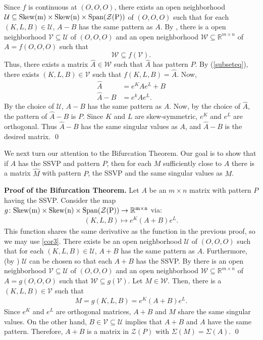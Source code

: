 \documentclass[preprint,12pt]{elsarticle}
\newcommand{\skw}{\rm Skew}
\newcommand{\mat}{\mathbb{R}}
\begin{document}
Since $f$ is continuous at $(O,O,O)$, there 
exists  an open neighborhood 
$\mathcal{U} \subseteq \skw (m)\times \skw (n) \times \mbox{Span}(\mathcal{Z}(P))$ of $(O,O,O)$   such that for each $(K,L,B) \in \mathcal{U}$, $A-B$ has the same pattern as $A$. By ,  there is a open neighborhood $\mathcal{V} \subseteq \mathcal{U}$ of $(O,O,O)$ and an open neighborhood $\mathcal{W} \subseteq \mat^{m\times n}$ of $A=f(O,O,O)$ such that 
\begin{equation}
\label{subseteq}
\mathcal{W} \subseteq f(\mathcal{V}).
\end{equation}
Thus, there exists a matrix $\hat{A} \in \mathcal{W}$ such that $\hat{A}$
has pattern $P$. 
By (\ref{subseteq}), there exists $(K,L,B) \in \mathcal{V}$ such that $f(K,L,B) = \hat{A}$.  Now,
\begin{align*}
    \hat{A} &= e^KAe^L + B\\
    \hat{A}- B &= e^kAe^L.
\end{align*}
By the choice of $\mathcal{U}$,  $A-B$ has the same pattern as $A$. Now, by the choice of $\hat{A}$, the pattern of 
$\hat{A} - B$ is $P$.
Since $K$ and $L$ are skew-symmetric, $e^K$ and $e^L$ are orthogonal. Thus $\hat{A}-B$ has the same singular values as $A$, and $\hat{A}-B$ is the desired matrix.
\qed


\bigskip
\bigskip
We next turn our attention to the Bifurcation Theorem. 
Our goal is to show that if $A$ has the SSVP and pattern $P$, then for each $M$ 
sufficiently close to $A$ there is a matrix $\hat{M}$ with pattern $P$, the SSVP 
and the same singular values as $M$. 

\bigskip \noindent
{\bf Proof of the Bifurcation Theorem.}
Let $A$ be an $m\times n$ matrix with pattern $P$ having the SSVP.  Consider the map $g\colon\skw(m)\times\skw(n) \times \mbox{Span} (\mathcal{Z}(P)) \to \mat^{m\times n}$ via:
    \begin{align*}
        (K,L,B)\mapsto e^K(A+B) e^L.
     \end{align*}
This function shares the same derivative as the function in the previous proof, so we may use \cref{cor3}. There exists be an open neighborhood $\mathcal{U}$ of $(O,O,O)$ such that for each $(K,L,B) \in \mathcal{U}$, $A+B$ has the same pattern as $A$. 
Furthermore,  (by ) $\mathcal{U}$ can be chosen so that each $A+B$
has the SSVP.  By  there is an open neighborhood $\mathcal{V}\subseteq \mathcal{U}$ of $(O,O,O)$ and an open neighborhood $\mathcal{W} \subseteq \mat^{m\times n}$ of $A=g(O,O,O)$ such that $\mathcal{W} \subseteq g(\mathcal{V})$. Let $M \in \mathcal{W}$. Then, there is a $(K, L, B) \in \mathcal{V}$ such that
\begin{align*}
    M=g(K,L,B) = e^{K}(A+B)e^{L}.
\end{align*}
Since $e^{K}$ and $e^{L}$ are orthogonal matrices, $A+B$ and $M$ share the same singular values. On the other hand, $B\in \mathcal{V} \subseteq \mathcal{U}$ implies that  $A+B$ and  $A$ have the same pattern.  Therefore, $A+B$ is a matrix in $\mathcal{Z}(P)$ with $\Sigma(M) = \Sigma(A)$. 
\qed 
\end{document}
